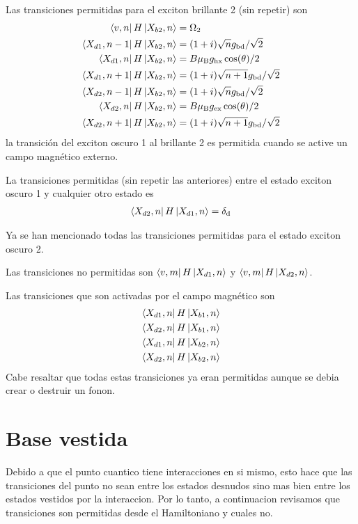 \documentclass[main.tex]{subfiles}
\begin{document}
Las transiciones permitidas para el exciton brillante 2 (sin repetir) son
\begin{align*}
    \bra{v,n}H\ket{X_{b2},n} &= \Omega_2\\
    \bra{X_{d1},n-1}H\ket{X_{b2},n} &= (1+i)\sqrt{n} g_\text{bd}/\sqrt{2}\\
    \bra{X_{d1},n}H\ket{X_{b2},n} &= B \mu_\text{B} g_\text{hx} \cos(\theta)/2\\
    \bra{X_{d1},n+1}H\ket{X_{b2},n} &= (1+i)\sqrt{n+1}g_\text{bd}/\sqrt{2}\\
    \bra{X_{d2},n-1}H\ket{X_{b2},n} &= (1+i)\sqrt{n} g_\text{bd}/\sqrt{2}\\
    \bra{X_{d2},n}H\ket{X_{b2},n} &= B \mu_\text{B} g_\text{ex} \cos(\theta)/2\\
    \bra{X_{d2},n+1}H\ket{X_{b2},n} &= (1+i)\sqrt{n+1}g_\text{bd}/\sqrt{2}
\end{align*}
la transición del exciton oscuro 1 al brillante 2 es permitida cuando se active un campo magnético externo.

La transiciones permitidas (sin repetir las anteriores) entre el estado exciton oscuro 1 y cualquier otro estado es
\begin{align*}
    \bra{X_{d2},n}H\ket{X_{d1},n} = \delta_\text{d}
\end{align*}

Ya se han mencionado todas las transiciones permitidas para el estado exciton oscuro 2.

Las transiciones no permitidas son $\bra{v,m}H\ket{X_{d1},n}$ y $\bra{v,m}H\ket{X_{d2},n}$.

Las transiciones que son activadas por el campo magnético son
\begin{align*}
 \bra{X_{d1},n}H\ket{X_{b1},n}\\
 \bra{X_{d2},n}H\ket{X_{b1},n}\\
 \bra{X_{d1},n}H\ket{X_{b2},n}\\
 \bra{X_{d2},n}H\ket{X_{b2},n}
\end{align*}
Cabe resaltar que todas estas transiciones ya eran permitidas aunque se debia crear o destruir un fonon.
\section{Base vestida}
Debido a que el punto cuantico tiene interacciones en si mismo, esto hace que las transiciones del punto no sean entre los estados desnudos sino mas bien entre los estados vestidos por la interaccion. Por lo tanto, a continuacion revisamos que transiciones son permitidas desde el Hamiltoniano y cuales no.
\end{document}
